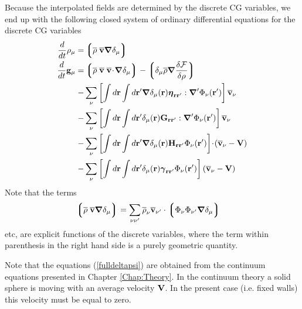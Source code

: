 \documentclass[b5paper,openright,10pt]{book}
\newcommand{\esc}{\!\cdot\!}
\newcommand{\llg}{\left\lgroup}
\newcommand{\rlg}{\right\rgroup}
\begin{document}
Because  the interpolated  fields are  determined by  the discrete  CG
variables,  we end  up with  the following  closed system  of ordinary
differential equations for the discrete CG variables
\begin{align}
\frac{d}{dt}\rho_\mu=&  \llg\overline{\rho} \; \overline{\bf v}\boldsymbol{\nabla}\delta_\mu \rlg
\nonumber\\
\frac{d}{dt}{\bf g}_\mu=&
\llg\overline{\rho}\; \overline{\bf v}\;\overline{\bf v}\esc\boldsymbol{\nabla}\delta_{\mu}\rlg
-\llg\delta_{\mu}\overline{\rho}\boldsymbol{\nabla}\frac{\delta{\cal F}}{\delta\rho}\rlg
\nonumber\\
-& \sum_\nu\left[
\int d{\bf r}\int d{\bf r}'
\boldsymbol{\nabla}\delta_{\mu}({\bf r})
\boldsymbol{\eta}_{{\bf r}{\bf r}'}:
{\boldsymbol{\nabla}^\prime} \Phi_\nu({\bf r}')\right]\overline{\bf v}_\nu
\nonumber\\
-& 
 \sum_\nu\left[\int d{\bf r}\int d{\bf r}'
\delta_{\mu}({\bf r}){\bf G}_{{\bf r}{\bf r}'}:{\boldsymbol{\nabla}^\prime}\Phi_\nu({\bf r}')\right]
\overline{\bf v}_\nu
\nonumber\\
-& 
 \sum_\nu\left[\int d{\bf r}\int d{\bf r}'
\boldsymbol{\nabla}\delta_{\mu}({\bf r})
{\bf H}_{{\bf r}{\bf r}'}\Phi_\nu({\bf r}')\right]
\esc(\overline{\bf v}_\nu-{\bf V})
\nonumber\\
-&
 \sum_\nu\left[\int d{\bf r}\int d{\bf r}'
\delta_{\mu}({\bf r})\boldsymbol{\gamma}_{{\bf r}{\bf r}'}\Phi_\nu({\bf r}')\right](\overline{\bf v}_\nu-{\bf V})
\label{fulldeltapsi}
\end{align}
Note that the terms
\begin{align}
  \llg \overline{\rho} \; \overline{\bf v}\boldsymbol{\nabla}\delta_\mu\rlg
&= \sum_{\nu\nu'}\overline{\rho}_{\nu}\overline{\bf v}_{\nu'} \cdot\llg\Phi_{\nu}\Phi_{\nu'}\boldsymbol{\nabla}\delta_{\mu}\rlg
\end{align}
etc, are  explicit  functions of  the discrete  variables, where  the term
within  parenthesis in  the  right  hand side  is  a purely  geometric
quantity.

Note that the equations (\ref{fulldeltapsi}) are obtained from the continuum equations presented in Chapter \ref{Chap:Theory}. In the continuum theory a solid sphere is moving with an average velocity ${\bf V}$. In the present case (i.e. fixed walls) this velocity must be equal to zero.  
\end{document}

